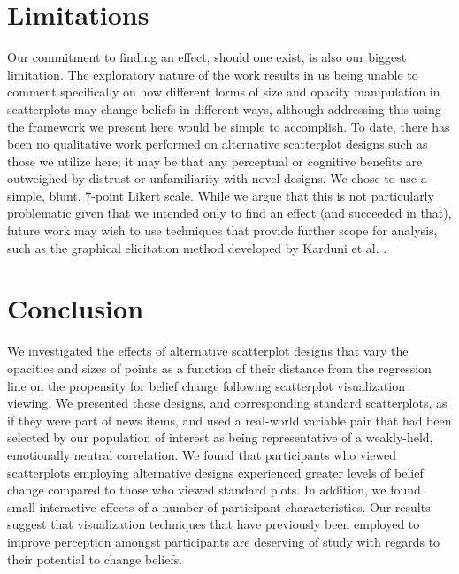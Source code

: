 \documentclass[sigconf]{acmart}
\begin{document}
\section{Limitations}\label{sec-limitations}

Our commitment to finding an effect, should one exist, is also our
biggest limitation. The exploratory nature of the work results in us
being unable to comment specifically on how different forms of size and
opacity manipulation in scatterplots may change beliefs in different
ways, although addressing this using the framework we present here would
be simple to accomplish. To date, there has been no qualitative work
performed on alternative scatterplot designs such as those we utilize
here; it may be that any perceptual or cognitive benefits are outweighed
by distrust or unfamiliarity with novel designs. We chose to use a
simple, blunt, 7-point Likert scale. While we argue that this is not
particularly problematic given that we intended only to find an effect
(and succeeded in that), future work may wish to use techniques that
provide further scope for analysis, such as the graphical elicitation
method developed by Karduni et al. \citep{karduni_2020, karduni_2023}.

\section{Conclusion}\label{sec-conclusion}

We investigated the effects of alternative scatterplot designs that vary
the opacities and sizes of points as a function of their distance from
the regression line on the propensity for belief change following
scatterplot visualization viewing. We presented these designs, and
corresponding standard scatterplots, as if they were part of news items,
and used a real-world variable pair that had been selected by our
population of interest as being representative of a weakly-held,
emotionally neutral correlation. We found that participants who viewed
scatterplots employing alternative designs experienced greater levels of
belief change compared to those who viewed standard plots. In addition,
we found small interactive effects of a number of participant
characteristics. Our results suggest that visualization techniques that
have previously been employed to improve perception amongst participants
are deserving of study with regards to their potential to change
beliefs.




\end{document}

